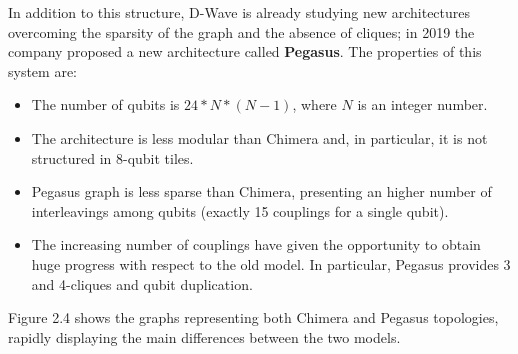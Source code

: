 In addition to this structure, D-Wave is already studying new architectures overcoming the sparsity of the graph and the absence of cliques; in 2019 the company proposed a new architecture called \textbf{Pegasus}. The properties of this system are:

\begin{itemize}
    \item The number of qubits is $24*N*(N-1)$, where $N$ is an integer number.
    \item The architecture is less modular than Chimera and, in particular, it is not structured in 8-qubit tiles.
    \item Pegasus graph is less sparse than Chimera, presenting an higher number of interleavings among qubits (exactly 15 couplings for a single qubit).
    \item The increasing number of couplings have given the opportunity to obtain huge progress with respect to the old model. In particular, Pegasus provides 3 and 4-cliques and qubit duplication.
\end{itemize}

Figure 2.4 shows the graphs representing both Chimera and Pegasus topologies, rapidly displaying the main differences between the two models. 

